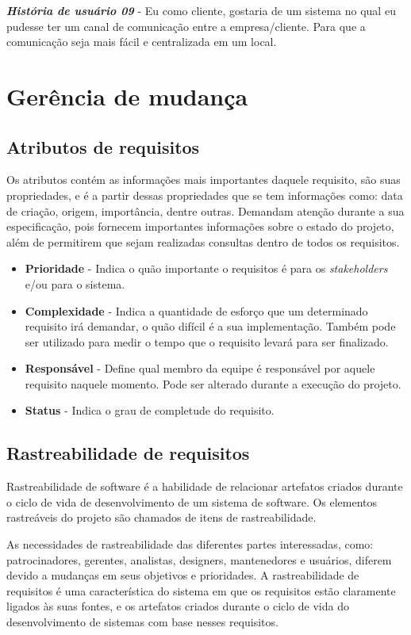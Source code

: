 \textbf{\textit{História de usuário 09}} - Eu como cliente, gostaria de um sistema no qual eu pudesse ter um canal de comunicação entre a empresa/cliente. Para que a comunicação seja mais fácil e centralizada em um local.

\section{Gerência de mudança}
\subsection{Atributos de requisitos}
Os atributos contém as informações mais importantes daquele requisito, são suas propriedades, e é a partir dessas propriedades que se tem informações como: data de criação, origem, importância, dentre outras. Demandam atenção durante a sua especificação, pois fornecem importantes informações sobre o estado do projeto, além de permitirem que sejam realizadas consultas dentro de todos os requisitos.
\begin{itemize}
\item \textbf{Prioridade} - Indica o quão importante o requisitos é para os \textit{stakeholders} e/ou para o sistema.
\item \textbf{Complexidade} - Indica a quantidade de esforço que um determinado requisito irá demandar, o quão difícil é a sua implementação. Também pode ser utilizado para medir o tempo que o requisito levará para ser finalizado.
\item \textbf{Responsável} - Define qual membro da equipe é responsável por aquele requisito naquele momento. Pode ser alterado durante a execução do projeto.
\item \textbf{Status} - Indica o grau de completude do requisito.
\end{itemize}
\subsection{Rastreabilidade de requisitos}
Rastreabilidade de software é a habilidade de relacionar artefatos criados durante o ciclo de vida de desenvolvimento de um sistema de software. Os elementos rastreáveis do projeto são chamados de itens de rastreabilidade.

As necessidades de rastreabilidade das diferentes partes interessadas, como: patrocinadores, gerentes, analistas, designers, mantenedores e usuários, diferem devido a mudanças em seus objetivos e prioridades. A rastreabilidade de requisitos é uma característica do sistema em que os requisitos estão claramente ligados às suas fontes, e os artefatos criados durante o ciclo de vida do desenvolvimento de sistemas com base nesses requisitos.

